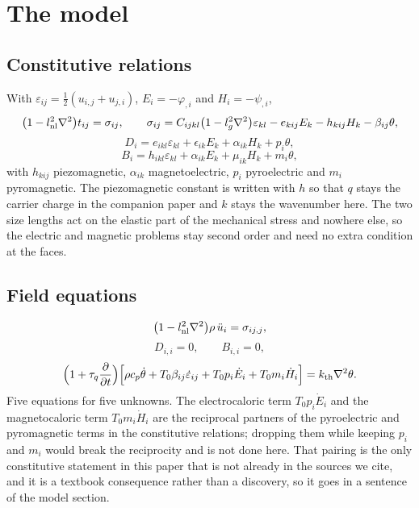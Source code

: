 \documentclass[11pt]{article}
\begin{document}
\section{The model}

\subsection{Constitutive relations}

With $\varepsilon_{ij}=\tfrac12(u_{i,j}+u_{j,i})$, $E_i=-\varphi_{,i}$ and $H_i=-\psi_{,i}$,
\begin{equation}
\bigl(1-l_{\rm nl}^2\nabla^2\bigr)t_{ij}=\sigma_{ij},\qquad
\sigma_{ij}=C_{ijkl}\bigl(1-l_g^2\nabla^2\bigr)\varepsilon_{kl}
-e_{kij}E_k-h_{kij}H_k-\beta_{ij}\theta ,
\end{equation}
\begin{equation}
D_i=e_{ikl}\varepsilon_{kl}+\epsilon_{ik}E_k+\alpha_{ik}H_k+p_i\theta ,
\end{equation}
\begin{equation}
B_i=h_{ikl}\varepsilon_{kl}+\alpha_{ik}E_k+\mu_{ik}H_k+m_i\theta ,
\end{equation}
with $h_{kij}$ piezomagnetic, $\alpha_{ik}$ magnetoelectric, $p_i$ pyroelectric and $m_i$ pyromagnetic. The
piezomagnetic constant is written with $h$ so that $q$ stays the carrier charge in the companion paper and
$k$ stays the wavenumber here. The two size lengths act on the elastic part of the mechanical stress and
nowhere else, so the electric and magnetic problems stay second order and need no extra condition at the
faces.

\subsection{Field equations}

\begin{equation}
\bigl(1-l_{\rm nl}^2\nabla^2\bigr)\rho\,\ddot u_i=\sigma_{ij,j},
\end{equation}
\begin{equation}
D_{i,i}=0,\qquad B_{i,i}=0,
\end{equation}
\begin{equation}
\Bigl(1+\tau_q\frac{\partial}{\partial t}\Bigr)
\Bigl[\rho c_p\dot\theta+T_0\beta_{ij}\dot\varepsilon_{ij}
+T_0p_i\dot E_i+T_0m_i\dot H_i\Bigr]=k_{\rm th}\nabla^2\theta .
\end{equation}
Five equations for five unknowns. The electrocaloric term $T_0p_i\dot E_i$ and the magnetocaloric term
$T_0m_i\dot H_i$ are the reciprocal partners of the pyroelectric and pyromagnetic terms in the constitutive
relations; dropping them while keeping $p_i$ and $m_i$ would break the reciprocity and is not done here. That
pairing is the only constitutive statement in this paper that is not already in the sources we cite, and it
is a textbook consequence rather than a discovery, so it goes in a sentence of the model section.
\end{document}
